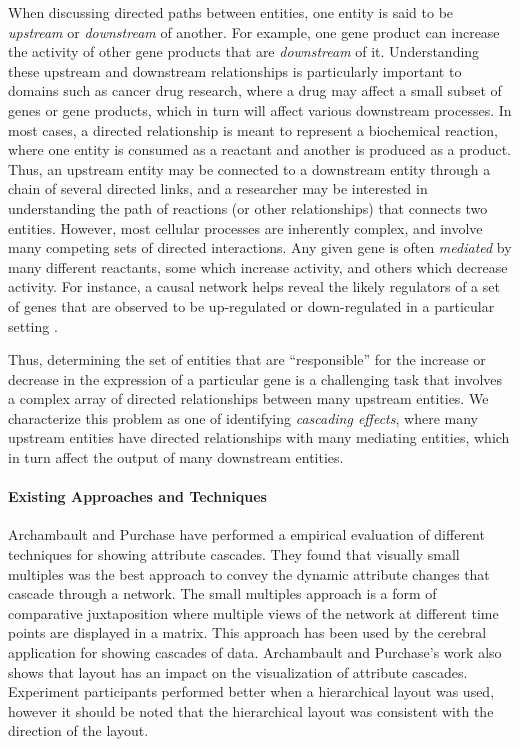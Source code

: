 When discussing directed paths between entities, one entity is said to be \emph{upstream} or \emph{downstream} of another.
For example, one gene product can increase the activity of other gene products that are \emph{downstream} of it.
Understanding these upstream and downstream relationships is particularly important to domains such as cancer drug research, where a drug may affect a small subset of genes or gene products, which in turn will affect various downstream processes.
In most cases, a directed relationship is meant to represent a biochemical reaction, where one entity is consumed as a reactant and another is produced as a product.
Thus, an upstream entity may be connected to a downstream entity through a chain of several directed links, and a researcher may be interested in understanding the path of reactions (or other relationships) that connects two entities.
However, most cellular processes are inherently complex, and involve many competing sets of directed interactions.
Any given gene is often \textit{mediated} by many different reactants, some which increase activity, and others which decrease activity.
For instance, a causal network helps reveal the likely regulators of a set of genes that are observed to be up-regulated or down-regulated in a particular setting \cite{felciano2013predictive, Kramer2013ipa-causal}.

Thus, determining the set of entities that are ``responsible'' for the increase or decrease in the expression of a particular gene is a challenging task that involves a complex array of directed relationships between many upstream entities.
We characterize this problem as one of identifying \textit{cascading effects}, where many upstream entities have directed relationships with many mediating entities, which in turn affect the output of many downstream entities.

\paragraph*{Existing Approaches and Techniques}

Archambault and Purchase \cite{Archambault2016} have performed a empirical evaluation of different techniques for showing attribute cascades.
They found that visually small multiples was the best approach to convey the dynamic attribute changes that cascade through a network.
The small multiples approach is a form of comparative juxtaposition where multiple views of the network at different time points are displayed in a matrix.
This approach has been used by the cerebral application for showing cascades of data.
Archambault and Purchase's work also shows that layout has an impact on the visualization of attribute cascades.
Experiment participants performed better when a hierarchical layout was used, however it should be noted that the hierarchical layout was consistent with the direction of the layout.


